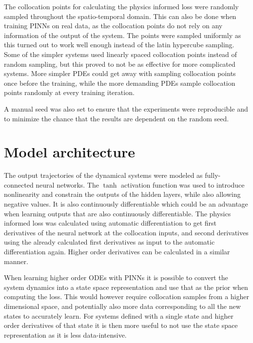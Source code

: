 The collocation points for calculating the physics informed loss were randomly sampled throughout the spatio-temporal domain. This can also be done when training PINNs on real data, as the collocation points do not rely on any information of the output of the system. The points were sampled uniformly as this turned out to work well enough instead of the latin hypercube sampling. Some of the simpler systems used linearly spaced collocation points instead of random sampling, but this proved to not be as effective for more complicated systems. More simpler PDEs could get away with sampling collocation points once before the training, while the more demanding PDEs sample collocation points randomly at every training iteration.

A manual seed was also set to ensure that the experiments were reproducible and to minimize the chance that the results are dependent on the random seed.



\section{Model architecture}

The output trajectories of the dynamical systems were modeled as fully-connected neural networks. The $\tanh$ activation function was used to introduce nonlinearity and constrain the outputs of the hidden layers, while also allowing negative values. It is also continuously differentiable which could be an advantage when learning outputs that are also continuously differentiable. The physics informed loss was calculated using automatic differentiation to get first derivatives of the neural network at the collocation inputs, and second derivatives using the already calculated first derivatives as input to the automatic differentiation again. Higher order derivatives can be calculated in a similar manner.

When learning higher order ODEs with PINNs it is possible to convert the system dynamics into a state space representation and use that as the prior when computing the loss. This would however require collocation samples from a higher dimensional space, and potentially also more data corresponding to all the new states to accurately learn. For systems defined with a single state and higher order derivatives of that state it is then more useful to not use the state space representation as it is less data-intensive.

